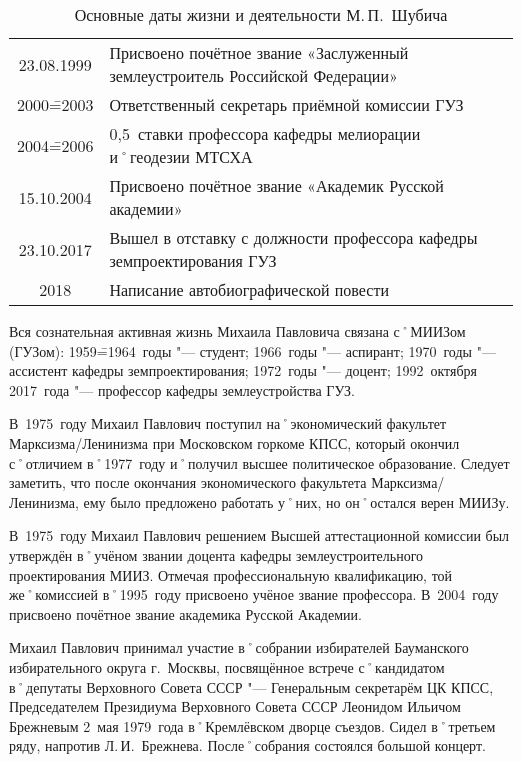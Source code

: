 \begin{table}[t]
{\begin{tabularx}{\textwidth}{cX}
		23.08.1999	&	Присвоено почётное звание «Заслуженный землеустроитель Российской Федерации»		\\
		2000\==2003		&	Ответственный секретарь приёмной комиссии ГУЗ										\\
		2004\==2006		&	0,5~ставки профессора кафедры мелиорации и˚геодезии МТСХА							\\
		15.10.2004	&	Присвоено почётное звание «Академик Русской академии»									\\
		23.10.2017	&	Вышел в отставку с должности профессора кафедры земпроектирования ГУЗ									\\
		2018				&	Написание автобиографической повести									\\
	\end{tabularx}
}
\caption{Основные даты жизни и деятельности М.\,П.~Шубича}
\label{tab:biograf}  
\end{table}

\FloatBarrier

Вся сознательная активная жизнь Михаила Павловича связана с˚МИИЗом (ГУЗом): 1959\==1964~годы "--- студент; 1966~годы "--- аспирант; 1970~годы "--- ассистент кафедры земпроектирования; 1972~годы "--- доцент; 1992~октября 2017~года "--- профессор кафедры землеустройства ГУЗ.

В~1975~году Михаил Павлович поступил на˚экономический факультет Марксизма\-/Ленинизма при Московском горкоме КПСС, который окончил с˚отличием в˚1977~году и˚получил высшее политическое образование. Следует заметить, что после окончания экономического факультета Марксизма\-/Ленинизма, ему было предложено работать у˚них, но он˚остался верен МИИЗу.

В~1975~году Михаил Павлович решением Высшей аттестационной комиссии был утверждён в˚учёном звании доцента кафедры землеустроительного проектирования МИИЗ. Отмечая профессиональную квалификацию, той же˚комиссией в˚1995~году присвоено учёное звание профессора. В~2004~году присвоено почётное звание академика Русской Академии.

Михаил Павлович принимал участие в˚собрании избирателей Бауманского избирательного округа г.~Москвы, посвящённое встрече с˚кандидатом в˚депутаты Верховного Совета СССР "--- Генеральным секретарём ЦК КПСС, Председателем Президиума Верховного Совета СССР Леонидом Ильичом Брежневым 2~мая 1979~года в˚Кремлёвском дворце съездов. Сидел в˚третьем ряду, напротив Л.\,И.~Брежнева. После˚собрания состоялся большой концерт. 

